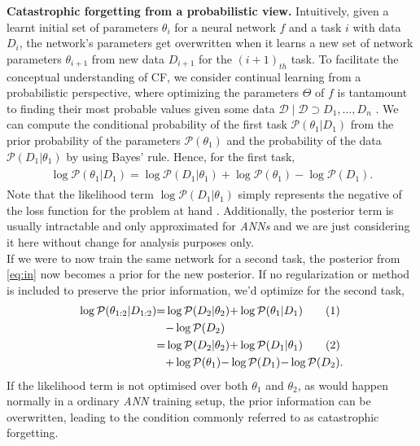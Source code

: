 \documentclass{article}
\newcommand\numberthis{\addtocounter{equation}{1}\tag{\theequation}}
\begin{document}
\textbf{Catastrophic forgetting from a probabilistic view.}
Intuitively, given a learnt initial set of parameters $\theta_i$ for a neural network $f$ and a task $i$ with data $D_i$, the network's parameters get overwritten
when it learns a new set of network parameters $\theta_{i+1}$ from new data $D_{i+1}$ for the $(i+1)_{th}$ task. 
To facilitate the conceptual understanding of CF, we consider continual learning from a probabilistic perspective, where  optimizing the parameters $\Theta$ of $f$ is tantamount to finding their most probable values given some data $\mathcal{D}\mid\mathcal{D}\supset D_1,...,D_n$  \cite{kirkpatrick2017overcoming}. 
We can compute the conditional probability of the first task $\mathcal{P}(\theta_1|D_1)$ from the prior probability of the parameters $\mathcal{P}(\theta_1)$ and the probability of the data $\mathcal{P}(D_1|\theta_1)$ by using Bayes’ rule. Hence, for the first task,
\begin{eqnarray}
\begin{aligned}
    \log \mathcal{P}(\theta_1|D_1) {=} \log \mathcal{P}(D_1|\theta_1){+}\log\mathcal{P}(\theta_1)
    {-}\log\mathcal{P}(D_1).\label{eq:in}
\end{aligned}
\end{eqnarray}
Note that the likelihood term $\log \mathcal{P}(D_1|\theta_1)$ simply represents the negative of the loss function for the problem at hand \cite{kirkpatrick2017overcoming}. Additionally, the posterior term is usually intractable and only approximated for \textit{ANNs} \cite{titsias2019functional, nguyen2017variational, kirkpatrick2017overcoming} and we are just considering it here without change for analysis purposes only.\\
If we were to now train the same network for a second task, the posterior from \eqref{eq:in} now becomes a prior for the new posterior. If no regularization or method is included to preserve the prior information, we'd optimize for the second task,
\begin{align*}
    \log \mathcal{P}(\theta_{1:2}|D_{1:2}) {=} &\log \mathcal{P}(D_2|\theta_2){+}\log\mathcal{P}(\theta_1|D_1)\numberthis\label{eq:2}\\
    &{-}\log\mathcal{P}(D_2)\\
    {=} &\log\mathcal{P}(D_2|\theta_2){+}\log\mathcal{P}(D_1|\theta_1)\numberthis\label{eq:3}\\
    &{+}\log\mathcal{P}(\theta_1){-}\log\mathcal{P}(D_1){-}\log\mathcal{P}(D_2).
\end{align*}
If the likelihood term is not optimised over both $\theta_1$ and $\theta_2$, as would happen normally in a ordinary \textit{ANN} training setup, 
the prior information can be overwritten, leading to the condition commonly  referred to as catastrophic forgetting.
\end{document}
